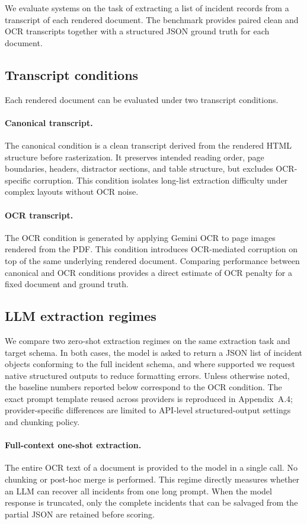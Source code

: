 We evaluate systems on the task of extracting a list of incident records from a transcript of each rendered document. The benchmark provides paired clean and OCR transcripts together with a structured JSON ground truth for each document.

\subsection{Transcript conditions}
Each rendered document can be evaluated under two transcript conditions.

\paragraph{Canonical transcript.}
The canonical condition is a clean transcript derived from the rendered HTML structure before rasterization. It preserves intended reading order, page boundaries, headers, distractor sections, and table structure, but excludes OCR-specific corruption. This condition isolates long-list extraction difficulty under complex layouts without OCR noise.

\paragraph{OCR transcript.}
The OCR condition is generated by applying Gemini OCR to page images rendered from the PDF. This condition introduces OCR-mediated corruption on top of the same underlying rendered document. Comparing performance between canonical and OCR conditions provides a direct estimate of OCR penalty for a fixed document and ground truth.

\subsection{LLM extraction regimes}
We compare two zero-shot extraction regimes on the same extraction task and target schema. In both cases, the model is asked to return a JSON list of incident objects conforming to the full incident schema, and where supported we request native structured outputs to reduce formatting errors. Unless otherwise noted, the baseline numbers reported below correspond to the OCR condition. The exact prompt template reused across providers is reproduced in Appendix~A.4; provider-specific differences are limited to API-level structured-output settings and chunking policy.

\paragraph{Full-context one-shot extraction.}
The entire OCR text of a document is provided to the model in a single call. No chunking or post-hoc merge is performed. This regime directly measures whether an LLM can recover all incidents from one long prompt. When the model response is truncated, only the complete incidents that can be salvaged from the partial JSON are retained before scoring.

